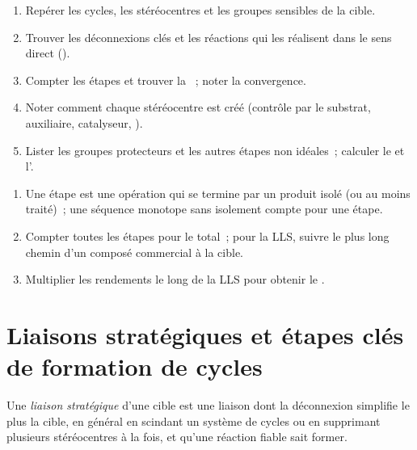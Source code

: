 \begin{method}\label{met:b3:total-synthesis:analyse}
\begin{enumerate}
  \item Repérer les cycles, les stéréocentres et les groupes sensibles de
        la cible.
  \item Trouver les déconnexions clés et les réactions qui les réalisent
        dans le sens direct ().
  \item Compter les étapes et trouver la ~;
        noter la convergence.
  \item Noter comment chaque stéréocentre est créé (contrôle par le
        substrat, auxiliaire, catalyseur, ).
  \item Lister les groupes protecteurs et les autres étapes non idéales~;
        calculer le  et l'.
\end{enumerate}
\end{method}

\begin{method}\label{met:b3:total-synthesis:count}
\begin{enumerate}
  \item Une étape est une opération qui se termine par un produit isolé
        (ou au moins traité)~; une séquence monotope sans isolement compte
        pour une étape.
  \item Compter toutes les étapes pour le total~; pour la LLS, suivre le
        plus long chemin d'un composé commercial à la cible.
  \item Multiplier les rendements le long de la LLS pour obtenir le
        .
\end{enumerate}
\end{method}

\section{Liaisons stratégiques et étapes clés de formation de cycles}

\begin{definition}\label{def:b3:total-synthesis:strategic-bond}
Une \emph{liaison stratégique} d'une cible est une liaison dont
la déconnexion simplifie le plus la cible, en général en scindant un
système de cycles ou en supprimant plusieurs stéréocentres à la fois, et
qu'une réaction fiable sait former.
\end{definition}

